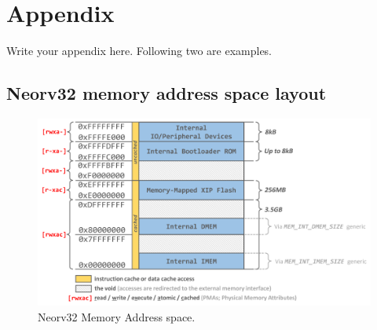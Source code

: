 \chapter{Appendix}

Write your appendix here. Following two are examples. 


\section{Neorv32 memory address space layout}
\label{app:mem_address}
\begin{figure}[h!]
    \centering
    \includegraphics[width=1\textwidth]{Images/neorv32_address_space.png}
    \caption{Neorv32 Memory Address space.}
\end{figure}



